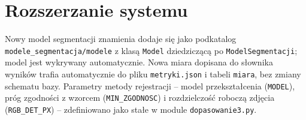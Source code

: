 \section{Rozszerzanie systemu}

Nowy model segmentacji znamienia dodaje się jako podkatalog \texttt{modele\_segmentacja/modele} z klasą \texttt{Model} dziedziczącą po \texttt{ModelSegmentacji}; model jest wykrywany automatycznie. Nowa miara dopisana do słownika wyników trafia automatycznie do pliku \texttt{metryki.json} i tabeli \texttt{miara}, bez zmiany schematu bazy. Parametry metody rejestracji -- model przekształcenia (\texttt{MODEL}), próg zgodności z wzorcem (\texttt{MIN\_ZGODNOSC}) i rozdzielczość roboczą zdjęcia (\texttt{RGB\_DET\_PX}) -- zdefiniowano jako stałe w module \texttt{dopasowanie3.py}.
